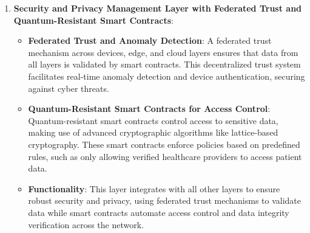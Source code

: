 \documentclass[12pt, oneside]{report}
\begin{document}
\begin{enumerate}
    \item \textbf{Security and Privacy Management Layer with Federated Trust and Quantum-Resistant Smart Contracts}:
    \begin{itemize}
        \item \textbf{Federated Trust and Anomaly Detection}: A federated trust mechanism across devices, edge, and cloud layers ensures that data from all layers is validated by smart contracts. This decentralized trust system facilitates real-time anomaly detection and device authentication, securing against cyber threats.
        \item \textbf{Quantum-Resistant Smart Contracts for Access Control}: Quantum-resistant smart contracts control access to sensitive data, making use of advanced cryptographic algorithms like lattice-based cryptography. These smart contracts enforce policies based on predefined rules, such as only allowing verified healthcare providers to access patient data.
        \item \textbf{Functionality}: This layer integrates with all other layers to ensure robust security and privacy, using federated trust mechanisms to validate data while smart contracts automate access control and data integrity verification across the network.
    \end{itemize}
\end{enumerate}
\end{document}
